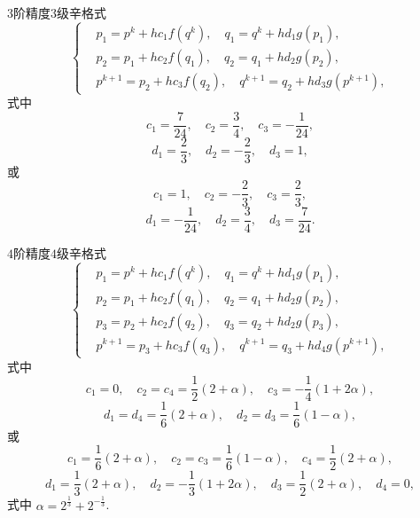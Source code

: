 $3$阶精度$3$级辛格式
\begin{equation*}
	\left\lbrace \begin{aligned}
		&p_1=p^{k}+hc_1f(q^{k}),\quad q_1=q^{k}+hd_1g(p_1),\\
		&p_2=p_1+hc_2f(q_1),\quad q_2=q_1+hd_2g(p_2),\\
		&p^{k+1}=p_2+hc_3f(q_2),\quad q^{k+1}=q_2+hd_3g(p^{k+1}),
	\end{aligned}\right.
\end{equation*}
式中
\begin{equation*}
	c_1=\frac{7}{24},\quad c_2=\frac{3}{4},\quad c_3=-\frac{1}{24},
\end{equation*}
\begin{equation*}
	d_1=\frac{2}{3},\quad d_2=-\frac{2}{3},\quad d_3=1,
\end{equation*}
或
\begin{equation*}
	c_1=1,\quad c_2=-\frac{2}{3},\quad c_3=\frac{2}{3},
\end{equation*}
\begin{equation*}
	d_1=-\frac{1}{24},\quad d_2=\frac{3}{4},\quad d_3=\frac{7}{24}.
\end{equation*}

$4$阶精度$4$级辛格式
\begin{equation*}
	\left\lbrace \begin{aligned}
		&p_1=p^{k}+hc_1f(q^{k}),\quad q_1=q^{k}+hd_1g(p_1),\\
		&p_2=p_1+hc_2f(q_1),\quad q_2=q_1+hd_2g(p_2),\\
		&p_3=p_2+hc_2f(q_2),\quad q_3=q_2+hd_2g(p_3),\\
		&p^{k+1}=p_3+hc_3f(q_3),\quad q^{k+1}=q_3+hd_4g(p^{k+1}),
	\end{aligned}\right.
\end{equation*}
式中
\begin{equation*}
	c_1=0,\quad c_2=c_4=\frac{1}{2}(2+\alpha),\quad c_3=-\frac{1}{4}(1+2\alpha),
\end{equation*}
\begin{equation*}
	d_1=d_4=\frac{1}{6}(2+\alpha),\quad d_2=d_3=\frac{1}{6}(1-\alpha),
\end{equation*}
或
\begin{equation*}
	c_1=\frac{1}{6}(2+\alpha),\quad c_2=c_3=\frac{1}{6}(1-\alpha),\quad c_4=\frac{1}{2}(2+\alpha),
\end{equation*}
\begin{equation*}
	d_1=\frac{1}{3}(2+\alpha),\quad d_2=-\frac{1}{3}(1+2\alpha),\quad d_3=\frac{1}{2}(2+\alpha),\quad d_4=0,
\end{equation*}
式中 $\alpha = 2^{\frac{1}{3}}+2^{-\frac{1}{3}}$.

